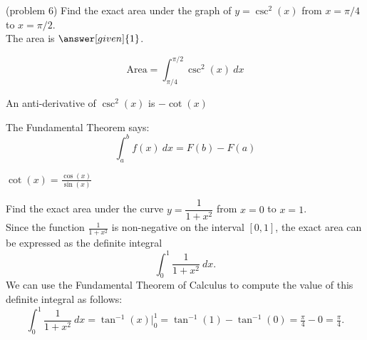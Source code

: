 \documentclass{ximera}
\begin{document}
\begin{problem}(problem 6)
Find the exact area under the graph of $y = \csc^2(x)$ from $x = \pi/4$ to $x = \pi/2$.\\
The area is $\answer[given]{1}$.
 \begin{hint}
  \[
  \text{Area} = \int_{\pi/4}^{\pi/2} \csc^2(x) \ dx
  \]
\end{hint}  
    \begin{hint}
      An anti-derivative of $\csc^2(x)$ is $-\cot(x)$
    \end{hint}
    
    \begin{hint}
      The Fundamental Theorem says:
      \[
      \int_a^b f(x) \ dx = F(b) - F(a)
      \]
    \end{hint}    
		\begin{hint}
      $\cot(x) = \frac{\cos(x)}{\sin(x)}$
    \end{hint}
		
\end{problem}


\begin{example}[example 7]
Find the exact area under the curve $y = \dfrac{1}{1+x^2}$ from $x=0$ to $x= 1$.\\
Since the function $\frac{1}{1+x^2}$ is non-negative on the interval $[0, 1]$, the exact area can be expressed as the definite integral
\[\int_0^{1} \frac{1}{1+x^2} \ dx.\]
We can use the Fundamental Theorem of Calculus to compute the value of this definite integral as follows:
\[
\int_0^{1} \frac{1}{1+x^2} \ dx = \tan^{-1}(x) \Big|_0^1 
= \tan^{-1}(1)- \tan^{-1}(0) = \tfrac{\pi}{4}-0 =\tfrac{\pi}{4}.
\]


\begin{image}
\end{image}


\end{example}
\end{document}
